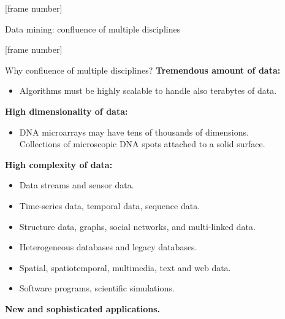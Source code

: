 \documentclass[aspectratio=169,t]{beamer}
\begin{document}
  {
    [frame number]
    \begin{frame}{Data mining: confluence of multiple disciplines}
    \centering
    \end{frame}
  }

  {
    [frame number]
    \begin{frame}{Why confluence of multiple disciplines?}
    \textbf{Tremendous amount of data:}
    \begin{itemize}
        \item Algorithms must be highly scalable to handle also terabytes of data.
    \end{itemize}

    \textbf{High dimensionality of data:}
    \begin{itemize}
        \item DNA microarrays may have tens of thousands of dimensions.\\
              Collections of microscopic DNA spots attached to a solid surface.
    \end{itemize}

    \textbf{High complexity of data:}
    \begin{itemize}
        \item Data streams and sensor data.
        \item Time-series data, temporal data, sequence data.
        \item Structure data, graphs, social networks, and multi-linked data.
        \item Heterogeneous databases and legacy databases.
        \item Spatial, spatiotemporal, multimedia, text and web data.
        \item Software programs, scientific simulations.
    \end{itemize}
    \textbf{New and sophisticated applications.}
    \end{frame}
  }
\end{document}
